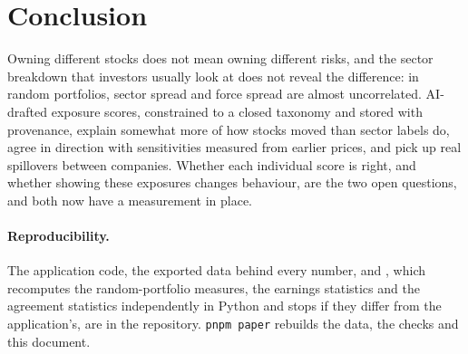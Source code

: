 \documentclass[11pt]{article}
\begin{document}
\section{Conclusion}

Owning different stocks does not mean owning different risks, and the sector breakdown that investors usually look at does not reveal the difference: in random portfolios, sector spread and force spread are almost uncorrelated. AI-drafted exposure scores, constrained to a closed taxonomy and stored with provenance, explain somewhat more of how stocks moved than sector labels do, agree in direction with sensitivities measured from earlier prices, and pick up real spillovers between companies. Whether each individual score is right, and whether showing these exposures changes behaviour, are the two open questions, and both now have a measurement in place.

\paragraph{Reproducibility.} The application code, the exported data behind every number, and , which recomputes the random-portfolio measures, the earnings statistics and the agreement statistics independently in Python and stops if they differ from the application's, are in the repository. \texttt{pnpm paper} rebuilds the data, the checks and this document.



\end{document}
